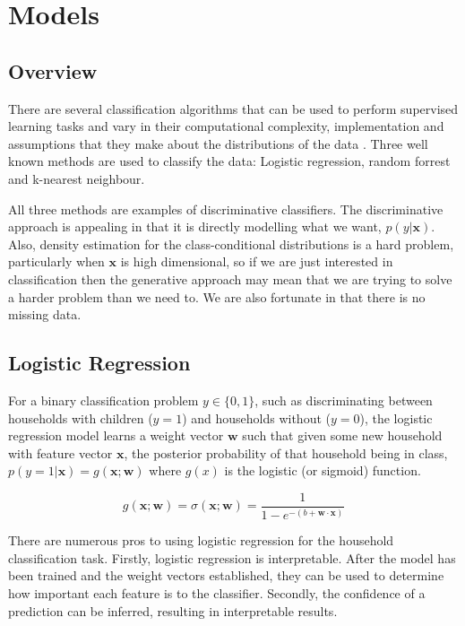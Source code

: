 
\chapter{Models}

\section{Overview}
There are several classification algorithms that can be used to perform supervised learning tasks and vary in their computational complexity, implementation and assumptions that they make about the distributions of the data \cite{Beckel3}. Three well known methods are used to classify the data: Logistic regression, random forrest and k-nearest neighbour.

All three methods are examples of discriminative classifiers. The discriminative approach is appealing in that it is directly modelling what we want, $p(y|\textbf{x})$. Also, density estimation for the class-conditional distributions is a hard problem, particularly when $\textbf{x}$ is high dimensional, so if we are just interested in classification then the generative approach may mean that we are trying to solve a harder problem than we need to\cite{Williams}. We are also fortunate in that there is no missing data. 

\section{Logistic Regression}
For a binary classification problem $y\in \{0,1\}$, such as discriminating between households with children ($y=1$) and households without ($y=0$), the logistic regression model learns a weight vector $\textbf{w}$ such that given some new household with feature vector $\textbf{x}$, the posterior probability of that household being in class, $p(y=1|\textbf{x})=g(\textbf{x}; \textbf{w})$ where $g(x)$ is the logistic (or sigmoid) function.

\[g(\textbf{x}; \textbf{w})=\sigma(\textbf{x};\textbf{w})=\frac{1}{1-e^{-(b+\textbf{w}\cdot{\textbf{x}})}}\]

There are numerous pros to using logistic regression for the household classification task. Firstly, logistic regression is interpretable. After the model has been trained and the weight vectors established, they can be used to determine how important each feature is to the classifier. Secondly, the confidence of a prediction can be inferred, resulting in interpretable results.


